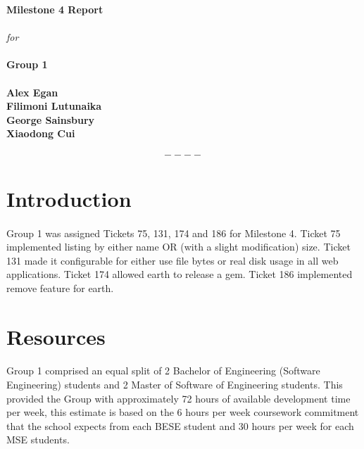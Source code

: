 \documentclass[10pt,a4,oneside]{article}
\begin{document}
\begin{titlepage}
\begin{center}

\vfill
\textbf{\huge Milestone 4 Report}\\ \textit{} \\ \textit{} 
\textit{for} \\ \textit{} \\ \textit{} 
\textbf{\huge Group 1}\\ \textit{} \\ \textit{}
\vfill
\textbf{Alex Egan \\ Filimoni Lutunaika \\ George Sainsbury \\ Xiaodong Cui}
\end{center}
\end{titlepage}

\newpage

\paragraph{}

\tableofcontents

\[----\]

\newpage

\section{Introduction}

\paragraph{}
Group 1 was assigned Tickets 75, 131, 174 and 186 for Milestone 4. Ticket 75 implemented listing by either name OR (with a slight modification) size. Ticket 131 made it configurable for either use file bytes or real disk usage in all web applications. Ticket 174 allowed earth to release a gem. Ticket 186 implemented remove feature for earth.

\section{Resources}

\paragraph{}
Group 1 comprised an equal split of 2 Bachelor of Engineering (Software Engineering)
 students and 2 Master of Software of Engineering students. This provided the Group with
  approximately 72 hours of available development time per week, this estimate is based on 
  the 6 hours per week coursework commitment that the school expects from each BESE student 
  and 30 hours per week for each MSE students.
\end{document}
